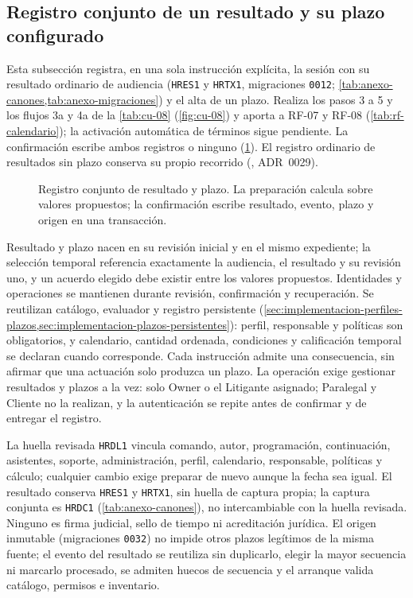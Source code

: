 \subsection{Registro conjunto de un resultado y su plazo configurado}\label{sec:impl-resultado-plazo-derivado}

Esta subsección registra, en una sola instrucción explícita, la sesión con su resultado ordinario de audiencia (\texttt{HRES1} y \texttt{HRTX1}, migraciones \texttt{0012}; \cref{tab:anexo-canones,tab:anexo-migraciones}) y el alta de un plazo. Realiza los pasos 3 a 5 y los flujos 3a y 4a de la \cref{tab:cu-08} (\cref{fig:cu-08}) y aporta a RF-07 y RF-08 (\cref{tab:rf-calendario}); la activación automática de términos sigue pendiente. La confirmación escribe ambos registros o ninguno (\cref{fig:impl-plazo-derivado}). El registro ordinario de resultados sin plazo conserva su propio recorrido (, ADR~0029).

\begin{figure}[t]
  \centering
  
  \caption{Registro conjunto de resultado y plazo. La preparación calcula sobre valores propuestos; la confirmación escribe resultado, evento, plazo y origen en una transacción.}
  \label{fig:impl-plazo-derivado}
\end{figure}

Resultado y plazo nacen en su revisión inicial y en el mismo expediente; la selección temporal referencia exactamente la audiencia, el resultado y su revisión uno, y un acuerdo elegido debe existir entre los valores propuestos. Identidades y operaciones se mantienen durante revisión, confirmación y recuperación. Se reutilizan catálogo, evaluador y registro persistente (\cref{sec:implementacion-perfiles-plazos,sec:implementacion-plazos-persistentes}): perfil, responsable y políticas son obligatorios, y calendario, cantidad ordenada, condiciones y calificación temporal se declaran cuando corresponde. Cada instrucción admite una consecuencia, sin afirmar que una actuación solo produzca un plazo. La operación exige gestionar resultados y plazos a la vez: solo Owner o el Litigante asignado; Paralegal y Cliente no la realizan, y la autenticación se repite antes de confirmar y de entregar el registro.

La huella revisada \texttt{HRDL1} vincula comando, autor, programación, continuación, asistentes, soporte, administración, perfil, calendario, responsable, políticas y cálculo; cualquier cambio exige preparar de nuevo aunque la fecha sea igual. El resultado conserva \texttt{HRES1} y \texttt{HRTX1}, sin huella de captura propia; la captura conjunta es \texttt{HRDC1} (\cref{tab:anexo-canones}), no intercambiable con la huella revisada. Ninguno es firma judicial, sello de tiempo ni acreditación jurídica. El origen inmutable (migraciones \texttt{0032}) no impide otros plazos legítimos de la misma fuente; el evento del resultado se reutiliza sin duplicarlo, elegir la mayor secuencia ni marcarlo procesado, se admiten huecos de secuencia y el arranque valida catálogo, permisos e inventario.

